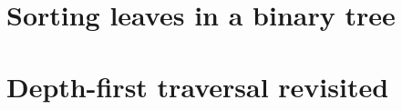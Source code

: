 \documentclass[11pt,a4paper]{article}
\author{Christian Rinderknecht}
\date{3 December 2008}
\begin{document}
\maketitle
\thispagestyle{empty}

\section{Sorting leaves in a binary tree}


\section{Depth-first traversal revisited}

\end{document}
